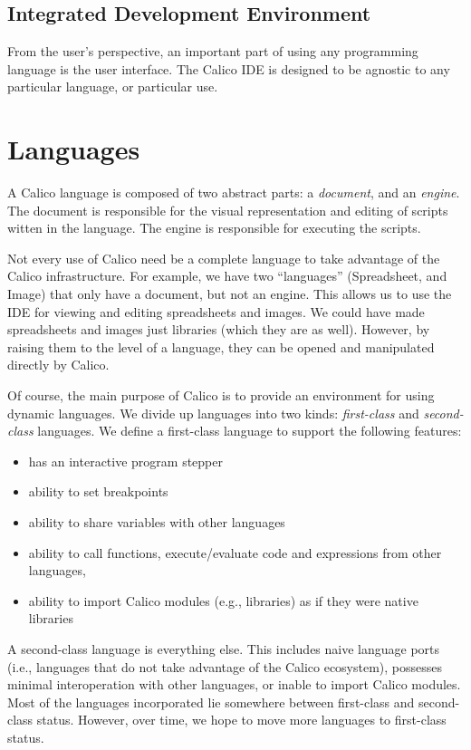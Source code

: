 \documentclass[preprint]{sigplanconf}
\begin{document}
\subsection{Integrated Development Environment}

From the user's perspective, an important part of using any
programming language is the user interface. The Calico IDE is designed
to be agnostic to any particular language, or particular use.

\section{Languages}

A Calico language is composed of two abstract parts: a
\textit{document}, and an \textit{engine}. The document is responsible
for the visual representation and editing of scripts witten in the
language. The engine is responsible for executing the scripts.

Not every use of Calico need be a complete language to take advantage
of the Calico infrastructure. For example, we have two ``languages''
(Spreadsheet, and Image) that only have a document, but not an
engine. This allows us to use the IDE for viewing and editing
spreadsheets and images. We could have made spreadsheets and images
just libraries (which they are as well). However, by raising them to
the level of a language, they can be opened and manipulated directly
by Calico.

Of course, the main purpose of Calico is to provide an environment for
using dynamic languages. We divide up languages into two kinds:
\textit{first-class} and \textit{second-class} languages. We define a
first-class language to support the following features:

\begin{itemize}

\item has an interactive program stepper
\item ability to set breakpoints
\item ability to share variables with other languages
\item ability to call functions, execute/evaluate code and expressions from other languages,
\item ability to import Calico modules (e.g., libraries) as if they were native libraries

\end{itemize}

A second-class language is everything else. This includes naive
language ports (i.e., languages that do not take advantage of the
Calico ecosystem), possesses minimal interoperation with other
languages, or inable to import Calico modules. Most of the languages
incorporated lie somewhere between first-class and second-class
status. However, over time, we hope to move more languages to
first-class status.
\end{document}
